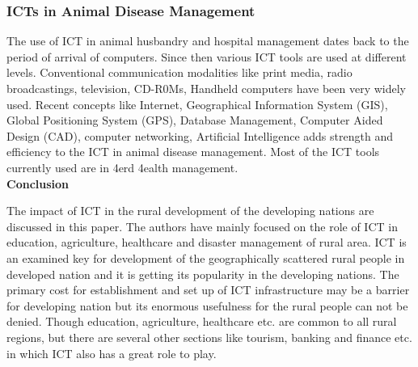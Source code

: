 \documentclass[12pt]{homework}
\begin{document}
\subsubsection{ICTs in Animal Disease Management}
The use of ICT in animal husbandry and hospital management dates back to the period of arrival of computers. Since then various ICT tools are used at different levels. Conventional communication modalities like print media, radio broadcastings, television, CD-R0Ms, Handheld computers have been very widely used. Recent concepts like Internet, Geographical Information System (GIS), Global Positioning System (GPS), Database Management, Computer Aided Design (CAD), computer networking, Artificial Intelligence adds strength and efficiency to the ICT in animal disease management. Most of the ICT tools currently used are in 4erd 4ealth management.\\

\newline
\textbf{Conclusion}

The impact of ICT in the rural development of the developing nations are discussed in this paper. The authors have mainly focused on the role of ICT in education, agriculture, healthcare and disaster management of rural area. ICT is an examined key for development of the geographically scattered rural people in developed nation and it is getting its popularity in the developing nations. The primary cost for establishment and set up of ICT infrastructure may be a barrier for developing nation but its enormous usefulness for the rural people can not be denied. Though education, agriculture, healthcare etc. are common to all rural regions, but there are several other sections like tourism, banking and finance etc. in which ICT also has a great role to play.\\

\end{document}
